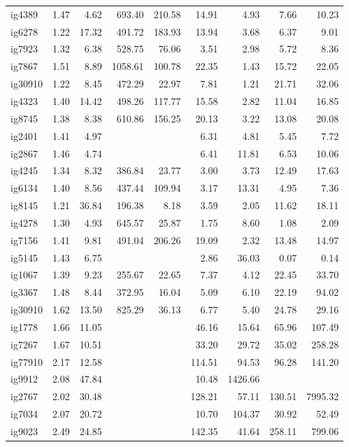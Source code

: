 \begin{longtable}{l|rr|rr|rr|rr}
ig4389 & 1.47 & 4.62 & 693.40 & 210.58 & 14.91 & 4.93 & 7.66 & 10.23 \\
ig6278 & 1.22 & 17.32 & 491.72 & 183.93 & 13.94 & 3.68 & 6.37 & 9.01 \\
ig7923 & 1.32 & 6.38 & 528.75 & 76.06 & 3.51 & 2.98 & 5.72 & 8.36 \\
ig7867 & 1.51 & 8.89 & 1058.61 & 100.78 & 22.35 & 1.43 & 15.72 & 22.05 \\
ig30910 & 1.22 & 8.45 & 472.29 & 22.97 & 7.81 & 1.21 & 21.71 & 32.06 \\
ig4323 & 1.40 & 14.42 & 498.26 & 117.77 & 15.58 & 2.82 & 11.04 & 16.85 \\
ig8745 & 1.38 & 8.38 & 610.86 & 156.25 & 20.13 & 3.22 & 13.08 & 20.08 \\
ig2401 & 1.41 & 4.97 &  &  & 6.31 & 4.81 & 5.45 & 7.72 \\
ig2867 & 1.46 & 4.74 &  &  & 6.41 & 11.81 & 6.53 & 10.06 \\
ig4245 & 1.34 & 8.32 & 386.84 & 23.77 & 3.00 & 3.73 & 12.49 & 17.63 \\
ig6134 & 1.40 & 8.56 & 437.44 & 109.94 & 3.17 & 13.31 & 4.95 & 7.36 \\
ig8145 & 1.21 & 36.84 & 196.38 & 8.18 & 3.59 & 2.05 & 11.62 & 18.11 \\
ig4278 & 1.30 & 4.93 & 645.57 & 25.87 & 1.75 & 8.60 & 1.08 & 2.09 \\
ig7156 & 1.41 & 9.81 & 491.04 & 206.26 & 19.09 & 2.32 & 13.48 & 14.97 \\
ig5145 & 1.43 & 6.75 &  &  & 2.86 & 36.03 & 0.07 & 0.14 \\
ig1067 & 1.39 & 9.23 & 255.67 & 22.65 & 7.37 & 4.12 & 22.45 & 33.70 \\
ig3367 & 1.48 & 8.44 & 372.95 & 16.04 & 5.09 & 6.10 & 22.19 & 94.02 \\
ig30910 & 1.62 & 13.50 & 825.29 & 36.13 & 6.77 & 5.40 & 24.78 & 29.16 \\
ig1778 & 1.66 & 11.05 &  &  & 46.16 & 15.64 & 65.96 & 107.49 \\
ig7267 & 1.67 & 10.51 &  &  & 33.20 & 29.72 & 35.02 & 258.28 \\
ig77910 & 2.17 & 12.58 &  &  & 114.51 & 94.53 & 96.28 & 141.20 \\
ig9912 & 2.08 & 47.84 &  &  & 10.48 & 1426.66 & & \\
ig2767 & 2.02 & 30.48 &  &  & 128.21 & 57.11 & 130.51 & 7995.32 \\
ig7034 & 2.07 & 20.72 &  &  & 10.70 & 104.37 & 30.92 & 52.49 \\
ig9023 & 2.49 & 24.85 &  &  & 142.35 & 41.64 & 258.11 & 799.06 \\

\end{longtable}
